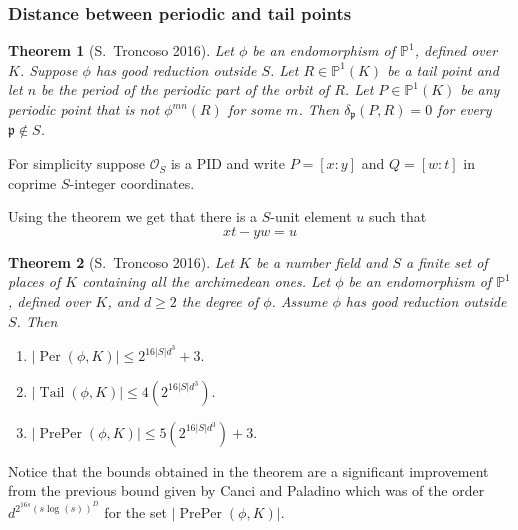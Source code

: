 \documentclass{beamer}
\def\PP{{\mathbb P}}
\def\pp{{\mathfrak p}}
\DeclareMathOperator{\Tail}{Tail}
\DeclareMathOperator{\Per}{Per}
\DeclareMathOperator{\PrePer}{PrePer}
\theoremstyle{thmstyle}
\theoremstyle{thmstyle}
\newtheorem*{mythm}{Theorem}
\theoremstyle{mystyle}
\theoremstyle{qstnstyle}
\begin{document}
\begin{frame}
\frametitle{Distance between periodic and tail points}
\begin{mythm}[S.\ Troncoso 2016]
Let $\phi$ be an endomorphism of $\PP^1$, defined over $K$. Suppose $\phi$ has good reduction outside $S$. Let $R\in\PP^1(K)$ be a tail point and let $n$ be the period of the periodic part of the orbit of $R$. Let $P\in\PP^1(K)$ be any periodic point that is not $\phi^{mn}(R)$ for some $m$. Then $\delta_\pp(P,R)=0$ for every $\pp \notin S$.
\end{mythm}

For simplicity suppose $\mathcal{O}_S$ is a PID and write $P=[x:y]$ and $Q=[w:t]$ in coprime $S$-integer coordinates.

\pause Using the theorem we get that there is a $S$-unit element $u$ such that
$$xt-yw=u $$
\end{frame}

\begin{frame}
\begin{mythm}[S.\ Troncoso 2016]
Let $K$ be a number field and $S$ a finite set of places of $K$ containing all the archimedean ones. Let $\phi $ be an endomorphism of $\PP^1$, defined over $K$, and $d \geq 2$ the degree of $\phi$. Assume $\phi$ has  good reduction outside $S$. Then
\begin{enumerate}
\item [(a)] $|\Per(\phi,K)| \leq  2^{16|S|d^3}+3.$

\item [(b)] $|\Tail(\phi,K)| \leq  4(2^{16|S|d^3}) .$

\item [(c)] $|\PrePer(\phi,K)| \leq 5(2^{16|S|d^3})+3.$

\end{enumerate}
\end{mythm}

Notice that the bounds obtained  in the theorem are a significant improvement from the previous bound given by Canci and Paladino which was of the order $\displaystyle d^{2^{16s}\left( s\log(s) \right)^{D}}$ for the set $|\PrePer(\phi,K)|$.

\end{frame}

%
%
%
%
\end{document}
